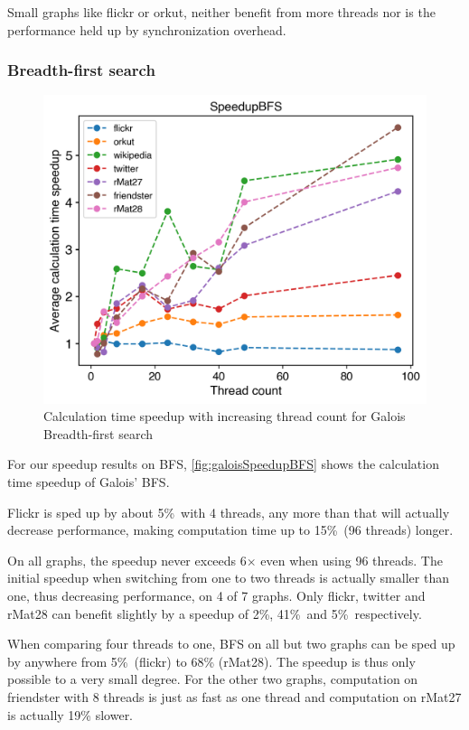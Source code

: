 Small graphs like flickr or orkut, neither benefit from more threads nor is the performance held up by synchronization overhead. 



\subsubsection{Breadth-first search}
\begin{figure}
	\includegraphics[width=\linewidth]{../../plots/singleNodeBFSGaloisThreads.png}
	\caption{Calculation time speedup with increasing thread count for Galois Breadth-first search}
	\label{fig:galoisSpeedupBFS}
\end{figure}

For our speedup results on BFS, \autoref{fig:galoisSpeedupBFS} shows the calculation time speedup of Galois' BFS.

Flickr is sped up by about 5\%\ with 4 threads, any more than that will actually decrease performance, making computation time up to 15\%\ (96 threads) longer.

On all graphs, the speedup never exceeds 6$\times$ even when using 96 threads.
The initial speedup when switching from one to two threads is actually smaller than one, thus decreasing performance, on 4 of 7 graphs. Only flickr, twitter and rMat28 can benefit slightly by a speedup of 2\%, 41\%\ and 5\%\ respectively.

When comparing four threads to one, BFS on all but two graphs can be sped up by anywhere from 5\%\ (flickr) to 68\% (rMat28). The speedup is thus only possible to a very small degree.
For the other two graphs, computation on friendster with 8 threads is just as fast as one thread and computation on rMat27 is actually 19\% slower.








